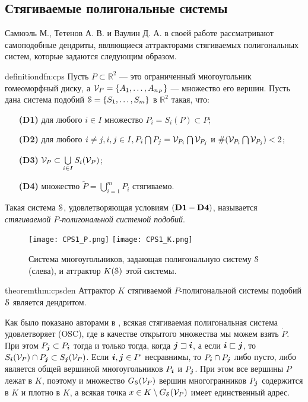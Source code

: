 \subsection{Стягиваемые полигональные системы}

Самюэль М., Тетенов А. В. и Ваулин Д. А. в своей работе \cite{STV2017} рассматривают самоподобные дендриты, являющиеся аттракторами стягиваемых полигональных систем, которые задаются следующим образом.


\begin{restatethis}{definition}{dfn:cps} \label{dfn:cps}
Пусть $P\subset\mathbb{R}^2$ --- это ограниченный многоугольник гомеоморфный диску, а $ {\mathcal V}_P= \{A_1, \ldots, A_{n_P}\}$ --- множество его вершин.
Пусть дана система подобий ${\EuScript S} = \{S_1, \ldots, S_m\}$ в ${\mathbb{R}}^2$ такая, что:
\begin{itemize}[nolistsep]
\item[{\bf (D1)}] для любого $i \in I$ множество $P_i = S_i (P) \subset P$; 
\item[{\bf (D2)}] для любого $i \ne j, i, j \in I, P_i \bigcap P_j =  {\mathcal V}_{P_i} \bigcap  {\mathcal V}_{P_j}$ и $\#({\mathcal V}_{P_i} \bigcap  {\mathcal V}_{P_j})<2$;  
\item[{\bf (D3)}] ${\mathcal V}_P \subset \bigcup \limits_{i \in I} S_i ({\mathcal V}_P)$;
\item[{\bf (D4)}] множество $\widetilde P = \bigcup \limits_{i = 1} ^m P_i$ стягиваемо.
\end{itemize} 
Такая система  ${\EuScript S}$, удовлетворяющая условиям $\bf (D1 - D4)$, называется  {\em стягиваемой $P$-полигональной системой подобий}.
\end{restatethis}

\begin{figure}[H]
\texttt{[image: CPS1\_P.png]}
\hfill
\texttt{[image: CPS1\_K.png]}
\caption{Система многоугольников, задающая полигональную систему ${\EuScript S}$ (слева), и аттрактор $K({\EuScript S})$ этой системы.}
\end{figure}

\begin{restatethis}{theorem}{thm:cpsden} %
Аттрактор $K$  стягиваемой  $P$-полигональной системы подобий ${\EuScript S}$ является дендритом.
\end{restatethis}

Как было показано авторами в \cite[Theorem 4]{TSV2017}, всякая стягиваемая полигональная система удовлетворяет (OSC), где  в качестве открытого множества мы можем взять $\dot P$.
При этом $P_{\bm{j}}\subset P_{\bm{i}}$ тогда и только тогда, когда  ${\bm{j}}\sqsupset{\bm{i}}$, а если ${\bm{i}}\sqsubset{\bm{j}}$, то  $ S_{\bm{i}}({\mathcal V}_P)\cap P_{\bm{j}}\subset S_{\bm{j}}({\mathcal V}_P)$. 
Если ${\bm{i}},{\bm{j}}\in I^*$ несравнимы, то $P_{\bm{i}}\cap P_{\bm{j}}$ либо пусто, либо является  общей вершиной многоугольников $P_{\bm{i}}$ и  $P_{\bm{j}}$. 
При этом все вершины $P$ лежат в $K$, поэтому и множество $G_{\EuScript S}({\mathcal V}_P)$ вершин многогранников $P_{\bm{j}}$ содержится в $K$ и плотно в $K$, а всякая точка $x\in K\setminus G_{\EuScript S}({\mathcal V}_P)$ имеет единственный адрес.


